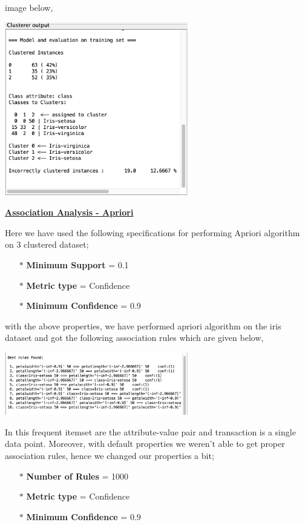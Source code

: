 \documentclass[a4paper,10pt]{article}
\begin{document}
image below,
\begin{center}
  \includegraphics[width=80mm,scale=0.10]{kmeans_clustering_1.png}
\end{center}
\par
\textbf{\underline{Association Analysis - Apriori}} \par
Here we have used the following specifications for performing Apriori algorithm on 3 clustered dataset;
\begin{enumerate}
  \item [$*$] \textbf{Minimum Support} = 0.1
  \item [$*$] \textbf{Metric type} = Confidence
  \item [$*$] \textbf{Minimum Confidence} = 0.9
\end{enumerate}
with the above properties, we have performed apriori algorithm on the iris dataset and got the following association rules
which are given below,
\begin{center}
  \includegraphics[width=80mm,scale=0.10]{apriori_assoociation.png}
\end{center}
In this frequent itemset are the attribute-value pair and transaction is a single data point. Moreover, with 
default properties we weren't able to get proper association rules, hence we changed our properties a bit;
\begin{enumerate}
  \item [$*$] \textbf{Number of Rules} = 1000
  \item [$*$] \textbf{Metric type} = Confidence
  \item [$*$] \textbf{Minimum Confidence} = 0.9
\end{enumerate}
\end{document}
